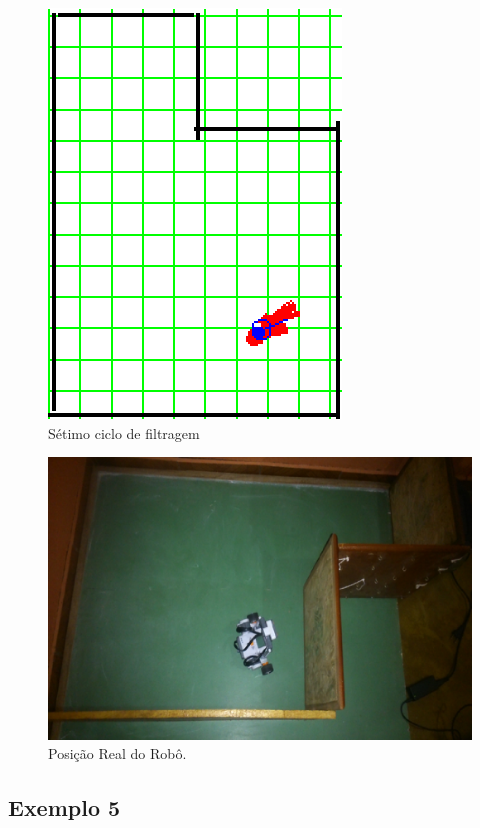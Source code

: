 \begin{figure}[H]
  \centering
  \includegraphics[scale=1]{figuras/cen4_ex4/8.eps}
  \caption[Sétimo Ciclo de Filtragem]{Sétimo ciclo de filtragem}
  \label{img:cen4_ex4_8}
\end{figure}

\begin{figure}[H]
  \centering
  \includegraphics[scale=1]{figuras/cen4_ex4/real.eps}
  \caption[Posição Real do Robô]{Posição Real do Robô.}
  \label{img:cen4_ex4_real}
\end{figure}


\subsection{Exemplo 5}


